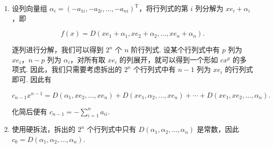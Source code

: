 \documentclass[UTF8,12pt,a4paper,fontset=fandol]{ctexart}
\begin{document}
\begin{solve}
\begin{enumerate}
        \item 设列向量组 $\alpha_i = (-a_{1i}, -a_{2i}, \ldots, -a_{ni})^{\mathrm{T}}$，将行列式的第 $i$ 列分解为 $xe_i + \alpha_i$，即

            \[
                f(x) = D(xe_1 + \alpha_1, xe_2 + \alpha_2, \ldots, xe_n + \alpha_n).
            \]

            逐列进行分解，我们可以得到 $2^n$ 个 $n$ 阶行列式. 设某个行列式中有 $p$ 列为 $xe_i$，$n-p$ 列为 $\alpha_i$，对所有取 $xe_i$ 的列展开，就可以得到一个形如 $cx^p$ 的多项式. 因此，我们只需要考虑拆出的 $2^n$ 个行列式中有 $n-1$ 列为 $xe_i$ 的行列式即可. 因此有

            \[
                c_{n-1}x^{n-1} = D(\alpha_1, xe_2, \ldots, xe_n) + D(xe_1, \alpha_2, \ldots, xe_n) + \cdots + D(xe_1, xe_2, \ldots, \alpha_n).
            \]

            化简后便有 $c_{n-1} = -\displaystyle\sum_{i=1}^n a_{ii}$.

        \item 使用硬拆法，拆出的 $2^n$ 个行列式中只有 $D(\alpha_1, \alpha_2, \ldots, \alpha_n)$ 是常数，因此 $c_0 = D(\alpha_1, \alpha_2, \ldots, \alpha_n)$.
    \end{enumerate}
\end{solve}
\end{document}
